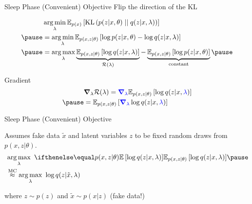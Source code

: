 \begin{frame}{Sleep Phase (Convenient) Objective}
Flip the direction of the KL
\begin{small}
\begin{equation*}
\begin{aligned}
&\argmin_{\lambda} \mathbb E_{p(x)}\left[ \KL{p(z|x, \theta)}{q(z|x, \lambda)} \right] \\ \pause
&= \argmin_{\lambda} \mathbb E_{p(x, z|\theta)}\left[ \log p(z|x, \theta) - \log q(z|x, \lambda) \right] \\ \pause
&= \argmax_{\lambda} \underbrace{\mathbb E_{p(x, z|\theta)}\left[ \log q(z|x, \lambda) \right]}_{\mathcal R(\lambda)} - \underbrace{\mathbb E_{p(x,z|\theta)}\left[ \log p(z|x, \theta) \right]}_{\text{constant}}  \pause
\end{aligned}
\end{equation*}
\end{small}
\vspace{-3pt}
Gradient 
\vspace{-2pt}
\begin{equation*}
\begin{aligned}
&\grad_\lambda \mathcal R(\lambda) = \textcolor{blue}{\grad_\lambda} \mathbb E_{p(x, z|\theta)}\left[ \log q(z|x, \textcolor{blue}{\lambda}) \right] \\ \pause
&=  \mathbb E_{p(x, z|\theta)}\left[ \textcolor{blue}{\grad_\lambda}  \log q(z|x, \textcolor{blue}{\lambda}) \right]  
\end{aligned}
\end{equation*}
\end{frame}

\begin{frame}{Sleep Phase (Convenient) Objective}


Assumes fake data $ \tilde{x} $ and latent variables $ z $ to be fixed random draws from $ p(x,z|\theta) $.
\begin{equation*}
\begin{aligned}
&\argmax_{\lambda}~  \E[p(x, z|\theta)]{\log q(z|x, \lambda)} \pause \\
&\overset{\text{MC}}{\approx} \argmax_{\lambda}~ \log q(z|\tilde x, \lambda)
\end{aligned}
\end{equation*} 

where $ z \sim p(z)$ and $\tilde{x} \sim p(x|z)$ \hfill \alert{(fake data!)}

\end{frame}

